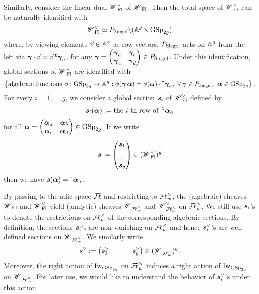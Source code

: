 Similarly, consider the linear dual $\scrW_{\Fl}^{\vee}$ of $\scrW_{\Fl}$. Then the total space of $\scrW_{\Fl}^{\vee}$ can be naturally identified with $$\scrW_{\Fl}^{\vee}\simeq P_{\Siegel}\backslash (\bbA^g\times \GSp_{2g})$$ where, by viewing elements $\vec{v}\in \bbA^g$ as row vectors, $P_{\Siegel}$ acts on $\bbA^g$ from the left via $ \bfgamma * \vec{v}  = \vec{v}\trans\bfgamma_a$, for any $\bfgamma=\begin{pmatrix}\bfgamma_a & \bfgamma_b\\ \bfgamma_c & \bfgamma_d\end{pmatrix}\in P_{\Siegel}$. Under this identification, global sections of $\scrW_{\Fl}^{\vee}$ are identified with $$\left\{\text{algebraic functions }\phi: \GSp_{2g}\rightarrow \bbA^g: \phi(\bfgamma\bfalpha)=\phi(\bfalpha)\cdot\trans\bfgamma_a,\,\,\forall \bfgamma\in P_{\Siegel},\,\, \bfalpha\in\GSp_{2g}\right\}.$$
For every $i=1,\ldots, g$, we consider a global section $\bfits_i$ of $\scrW_{\Fl}^{\vee}$ defined by $$\bfits_i(\bfalpha):= \text{the $i$-th row of }\trans\bfalpha_a$$ for all $\bfalpha=\begin{pmatrix}\bfalpha_a & \bfalpha_b\\ \bfalpha_c & \bfalpha_d\end{pmatrix}\in \GSp_{2g}$. If we write 
$$\bfits:=\begin{pmatrix}\bfits_1\\ \vdots\\ \bfits_g\end{pmatrix}\in (\scrW_{\Fl}^{\vee})^g$$ 
then we have $\bfits(\bfalpha)=\trans\bfalpha_a$.

By passing to the adic space $\adicFL$ and restricting to $\adicFL_w^{\times}$, the (algebraic) sheaves $\scrW_{\Fl}$ and $\scrW_{\Fl}^{\vee}$ yield (analytic) sheaves $\scrW_{\adicFL_w^{\times}}$ and $\scrW_{\adicFL_w^{\times}}^{\vee}$ on $\adicFL_w^\times$. We still use $\bfits_i$'s to denote the restrictions on $\adicFL_w^{\times}$ of the corresponding algebraic sections. By definition, the sections $\bfits_i$'s are non-vanishing on $\adicFL_w^{\times}$ and hence $\bfits_i^{\vee}$'s are well-defined sections on $\scrW_{\adicFL_w^{\times}}$. We similarly write
$$\bfits^{\vee}:=\begin{pmatrix}\bfits_1^{\vee} & \cdots &  \bfits_g^{\vee}\end{pmatrix}\in (\scrW_{\adicFL_w^{\times}})^g.$$
Moreover, the right action of $\Iw_{\GSp_{2g}}$ on $\adicFL_w^\times$ induces a right action of $\Iw_{\GSp_{2g}}$ on $\scrW_{\adicFL_w^{\times}}$. For later use, we would like to understand the behavior of $\bfits_i^{\vee}$'s under this action.

